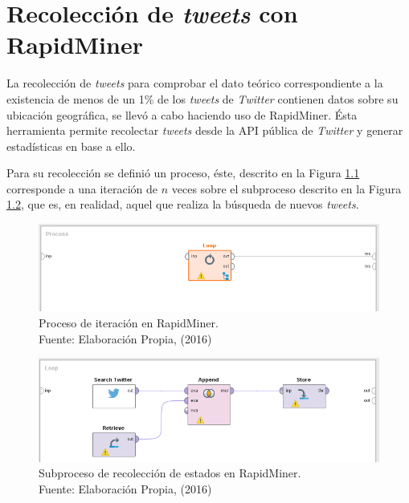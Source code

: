 

\chapter{Recolección de \textit{tweets} con RapidMiner}
\label{apendice:apendice1}

La recolección de \textit{tweets} para comprobar el dato teórico correspondiente a la existencia de menos de un 1\% de los \textit{tweets} de \textit{Twitter} contienen datos sobre su ubicación geográfica, se llevó a cabo haciendo uso de RapidMiner. Ésta herramienta permite recolectar \textit{tweets} desde la API pública de \textit{Twitter} y generar estadísticas en base a ello.

Para su recolección se definió un proceso, éste, descrito en la Figura \ref{fig:RMP} corresponde a una iteración de $n$ veces sobre el subproceso descrito en la Figura \ref{fig:RMSP}, que es, en realidad, aquel que realiza la búsqueda de nuevos \textit{tweets}.

\begin{figure}[H]
        \centering
        \captionsetup{justification=centering}
        \includegraphics[scale=0.8]{images/RMProcess.png}
        \caption[Proceso de iteración en RapidMiner.]{Proceso de iteración en RapidMiner.\\Fuente: Elaboración Propia, (2016)}
        \label{fig:RMP}
\end{figure}

\begin{figure}[H]
        \centering
        \captionsetup{justification=centering}
        \includegraphics[scale=0.8]{images/RMSProcess.png}
        \caption[Subproceso de recolección de estados en RapidMiner.]{Subproceso de recolección de estados en RapidMiner.\\Fuente: Elaboración Propia, (2016)}
        \label{fig:RMSP}
\end{figure}

